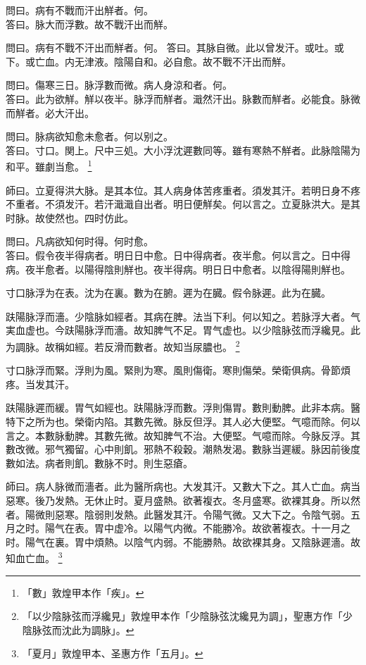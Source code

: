 \documentclass[12pt,oneside,UTF8,b5paper]{ctexbook}她她她她她她她
\begin{document}
問曰。病有不戰而汗出觧者。何。\\
答曰。脉大而浮數。故不戰汗出而觧。

問曰。病有不戰不汗出而觧者。何。
答曰。其脉自微。此以曾发汗。或吐。或下。或亡血。内无津液。陰陽自和。必自愈。故不戰不汗出而觧。

問曰。傷寒三日。脉浮數而微。病人身涼和者。何。\\
答曰。此为欲觧。觧以夜半。脉浮而觧者。濈然汗出。脉數而觧者。必能食。脉微而觧者。必大汗出。

問曰。脉病欲知愈未愈者。何以别之。\\
答曰。寸口。関上。尺中三処。大小浮沈遲數同等。雖有寒熱不觧者。此脉陰陽为和平。雖劇当愈。
	\footnote{「數」敦煌甲本作「疾」。}

師曰。立夏得洪大脉。是其本位。其人病身体苦疼重者。須发其汗。若明日身不疼不重者。不須发汗。若汗濈濈自出者。明日便觧矣。何以言之。立夏脉洪大。是其时脉。故使然也。四时仿此。

問曰。凡病欲知何时得。何时愈。\\
答曰。假令夜半得病者。明日日中愈。日中得病者。夜半愈。何以言之。日中得病。夜半愈者。以陽得陰則觧也。夜半得病。明日日中愈者。以陰得陽則觧也。

寸口脉浮为在表。沈为在裏。數为在腑。遲为在臓。假令脉遲。此为在臓。

趺陽脉浮而濇。少陰脉如經者。其病在脾。法当下利。何以知之。若脉浮大者。气実血虚也。今趺陽脉浮而濇。故知脾气不足。胃气虚也。以少陰脉弦而浮纔見。此为調脉。故稱如經。若反滑而數者。故知当尿膿也。
	\footnote{「以少陰脉弦而浮纔見」敦煌甲本作「少陰脉弦沈纔見为調」，聖惠方作「少陰脉弦而沈此为調脉」。}

寸口脉浮而緊。浮則为風。緊則为寒。風則傷衛。寒則傷榮。榮衛俱病。骨節煩疼。当发其汗。

趺陽脉遲而緩。胃气如經也。趺陽脉浮而數。浮則傷胃。數則動脾。此非本病。醫特下之所为也。榮衛内陷。其數先微。脉反但浮。其人必大便堅。气噫而除。何以言之。本數脉動脾。其數先微。故知脾气不治。大便堅。气噫而除。今脉反浮。其數改微。邪气獨留。心中則飢。邪熱不殺穀。潮熱发渴。數脉当遲緩。脉因前後度數如法。病者則飢。數脉不时。則生惡瘡。

師曰。病人脉微而濇者。此为醫所病也。大发其汗。又數大下之。其人亡血。病当惡寒。後乃发熱。无休止时。夏月盛熱。欲著複衣。冬月盛寒。欲裸其身。所以然者。陽微則惡寒。陰弱則发熱。此醫发其汗。令陽气微。又大下之。令陰气弱。五月之时。陽气在表。胃中虚冷。以陽气内微。不能勝冷。故欲著複衣。十一月之时。陽气在裏。胃中煩熱。以陰气内弱。不能勝熱。故欲裸其身。又陰脉遲濇。故知血亡血。
	\footnote{「夏月」敦煌甲本、圣惠方作「五月」。}
\end{document}

